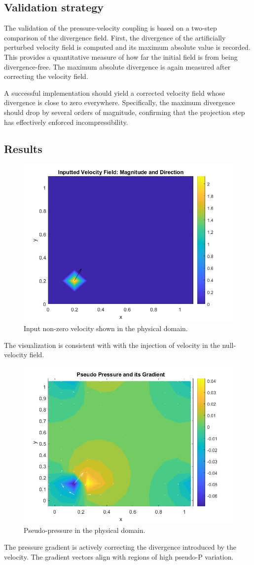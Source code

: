 \subsection{Validation strategy}

The validation of the pressure-velocity coupling is based on a two-step comparison of the divergence field. First, the divergence of the artificially perturbed velocity field is computed and its maximum absolute value is recorded. This provides a quantitative measure of how far the initial field is from being divergence-free. The maximum absolute divergence is again measured after correcting the velocity field.

A successful implementation should yield a corrected velocity field whose divergence is close to zero everywhere. Specifically, the maximum divergence should drop by several orders of magnitude, confirming that the projection step has effectively enforced incompressibility.

\subsection{Results}

\begin{figure}[H]
    \centering
    \includegraphics[width=0.7\linewidth]{imatges/InputV.png}
    \caption{Input non-zero velocity shown in the physical domain.}
    \label{fig:InputV}
\end{figure}

The visualization is consistent with with the injection of velocity in the null-velocity field.

\begin{figure}[H]
    \centering
    \includegraphics[width=0.7\linewidth]{imatges/PseudoP.png}
    \caption{Pseudo-pressure in the physical domain.}
    \label{fig:PseudoP}
\end{figure}

The pressure gradient is actively correcting the divergence introduced by the velocity. The gradient vectors align with regions of high pseudo-P variation.
